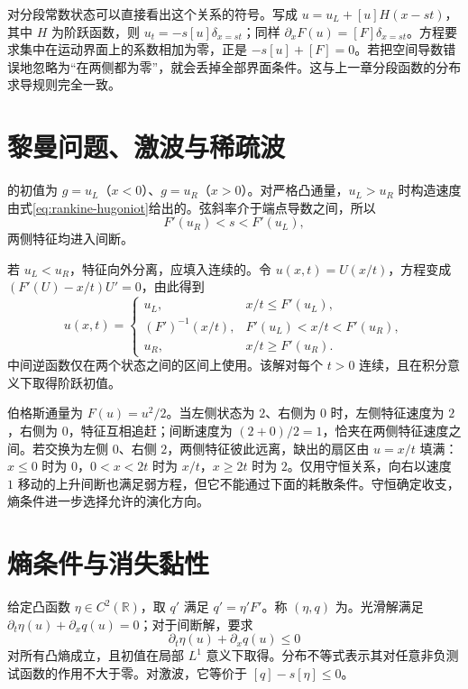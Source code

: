 \documentclass[UTF8,12pt,a4paper,fontset=fandol]{ctexbook}
\begin{document}
对分段常数状态可以直接看出这个关系的符号。写成 $u=u_L+[u]H(x-st)$，其中 $H$ 为阶跃函数，则 $u_t=-s[u]\delta_{x=st}$；同样 $\partial_xF(u)=[F]\delta_{x=st}$。方程要求集中在运动界面上的系数相加为零，正是 $-s[u]+[F]=0$。若把空间导数错误地忽略为“在两侧都为零”，就会丢掉全部界面条件。这与上一章分段函数的分布求导规则完全一致。

\section{黎曼问题、激波与稀疏波}
的初值为 $g=u_L$（$x<0$）、$g=u_R$（$x>0$）。对严格凸通量，$u_L>u_R$ 时构造速度由式\eqref{eq:rankine-hugoniot}给出的。弦斜率介于端点导数之间，所以
\[
 F'(u_R)<s<F'(u_L),
\]
两侧特征均进入间断。

若 $u_L<u_R$，特征向外分离，应填入连续的。令 $u(x,t)=U(x/t)$，方程变成 $(F'(U)-x/t)U'=0$，由此得到
\[
 u(x,t)=\begin{cases}
 u_L,&x/t\le F'(u_L),\\
 (F')^{-1}(x/t),&F'(u_L)<x/t<F'(u_R),\\
 u_R,&x/t\ge F'(u_R).
 \end{cases}
\]
中间逆函数仅在两个状态之间的区间上使用。该解对每个 $t>0$ 连续，且在积分意义下取得阶跃初值。

\begin{example}
伯格斯通量为 $F(u)=u^2/2$。当左侧状态为 $2$、右侧为 $0$ 时，左侧特征速度为 $2$，右侧为 $0$，特征互相追赶；间断速度为 $(2+0)/2=1$，恰夹在两侧特征速度之间。若交换为左侧 $0$、右侧 $2$，两侧特征彼此远离，缺出的扇区由 $u=x/t$ 填满：$x\le0$ 时为 $0$，$0<x<2t$ 时为 $x/t$，$x\ge2t$ 时为 $2$。仅用守恒关系，向右以速度 $1$ 移动的上升间断也满足弱方程，但它不能通过下面的耗散条件。守恒确定收支，熵条件进一步选择允许的演化方向。
\end{example}

\section{熵条件与消失黏性}
给定凸函数 $\eta\in C^2(\mathbb R)$，取 $q'$ 满足 $q'=\eta'F'$。称 $(\eta,q)$ 为。光滑解满足 $\partial_t\eta(u)+\partial_xq(u)=0$；对于间断解，要求
\begin{equation}
 \partial_t\eta(u)+\partial_xq(u)\le0
 \label{eq:entropy-inequality}
\end{equation}
对所有凸熵成立，且初值在局部 $L^1$ 意义下取得。分布不等式表示其对任意非负测试函数的作用不大于零。对激波，它等价于 $[q]-s[\eta]\le0$。
\end{document}
